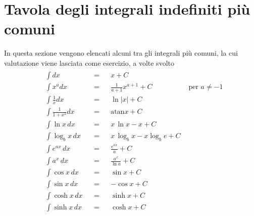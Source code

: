 \documentclass[letterpaper,10pt,italian]{jupyterBook}
\begin{document}
\section{Tavola degli integrali indefiniti più comuni}
\label{\detokenize{ch/infinitesimal_calculus/integrals-table:tavola-degli-integrali-indefiniti-piu-comuni}}\label{\detokenize{ch/infinitesimal_calculus/integrals-table:infinitesimal-calculus-integrals-table}}\label{\detokenize{ch/infinitesimal_calculus/integrals-table::doc}}
\sphinxAtStartPar
In questa sezione vengono elencati alcuni tra gli integrali più comuni, la cui valutazione viene lasciata come esercizio, a volte svolto
\begin{equation*}
\begin{split}\begin{aligned}
 &  \int dx                 && = &&  x + C                                                     \\
 &  \int x^a dx             && = &&  \frac{1}{a+1} x^{a+1} + C       &   \text{ per } a \ne -1 \\
 &  \int \frac{1}{x} dx     && = &&  \ln |x| + C                                               \\
 &  \int \frac{1}{1+x^2} dx && = &&  \text{atan} x + C                                         \\
 &  \int \ln x \, dx        && = &&  x \, \ln x - x + C                                        \\
 &  \int \log_b x \, dx     && = &&  x \, \log_b x - x \log_b e + C                            \\
 &  \int e^{a x} \, dx      && = &&  \frac{e^{ax}}{a} + C                                      \\
 &  \int a^x \, dx          && = &&  \frac{a^x}{\ln a} + C                                     \\
 &  \int \cos x \, dx       && = &&  \sin x + C                                                \\
 &  \int \sin x \, dx       && = && -\cos x + C                                                \\
 &  \int \cosh x \, dx      && = &&  \sinh x + C                                               \\
 &  \int \sinh x \, dx      && = &&  \cosh x + C                                               \\
\end{aligned}\end{split}
\end{equation*}
\sphinxstepscope
\end{document}
